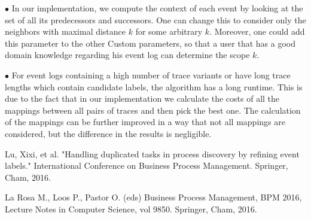 \documentclass[notitlepage]{article}
\begin{document}
$\bullet$
In our implementation, we compute the context of each event by looking at the set of all its predecessors and successors.
One can change this to consider only the neighbors with maximal distance $k$ for some arbitrary $k$.
Moreover, one could add this parameter to the other Custom parameters, so that a user that has a good domain knowledge regarding his event log can determine the scope $k$.
\medskip

$\bullet$
For event logs containing a high number of trace variants or have long trace lengths which contain candidate labels, the algorithm has a long runtime.
This is due to the fact that in our implementation we calculate the costs of all the mappings between all pairs of traces and then pick the best one.
The calculation of the mappings can be further improved in a way that not all mappings are considered, but the difference in the results is negligible.

%




\begin{thebibliography}{5}
Lu, Xixi, et al. "Handling duplicated tasks in process discovery by refining event labels." International Conference on Business Process Management. Springer, Cham, 2016.

\bibitem{}
La Rosa M., Loos P., Pastor O. (eds) Business Process Management, BPM 2016, Lecture Notes in Computer Science, vol 9850. Springer, Cham, 2016.






\end{thebibliography}
\end{document}
